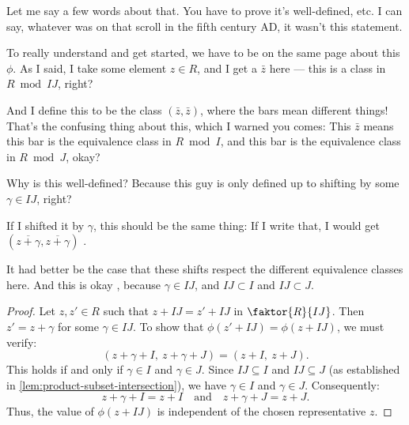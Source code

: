 \begin{speech}[01:21:59 - 01:24:09]
Let me say a few words about that. You have to prove it's well-defined, etc. I can say, whatever was on that scroll in the fifth century AD, it wasn't this statement. 

To really understand and get started, we have to be on the same page about this $\phi$. As I said, I take some element $z \in R$, and I get a $\bar{z}$ here --- this is a class in $R \bmod IJ$, right? 

And I define this to be the class $(\bar{z}, \bar{z})$, where the bars mean different things! That's the confusing thing about this, which I warned you comes: This $\bar{z}$ means this bar is the equivalence class in $R \bmod I$, and this bar is the equivalence class in $R \bmod J$, okay?

Why is this well-defined? Because this guy is only defined up to shifting by some $\gamma \in IJ$, right? 

If I shifted it by $\gamma$, this should be the same thing: If I write that, I would get $(\overline{z + \gamma}, \overline{z + \gamma})$ .

It had better be the case that these shifts respect the different equivalence classes here. And this is okay , because $\gamma \in IJ$, and $IJ \subset I$ and $IJ \subset J$.
\end{speech}

\begin{content}

\begin{proof}
Let $z, z' \in R$ such that $z + IJ = z' + IJ$ in $\faktor{R}{IJ}$.
Then $z' = z + \gamma$ for some $\gamma \in IJ$.
To show that $\phi(z' + IJ) = \phi(z + IJ)$, we must verify:
\[
(z + \gamma + I, \ z + \gamma + J) = (z + I, \ z + J).
\]
This holds if and only if $\gamma \in I$ and $\gamma \in J$.
Since $IJ \subseteq I$ and $IJ \subseteq J$ (as established in \cref{lem:product-subset-intersection}), we have $\gamma \in I$ and $\gamma \in J$.
Consequently:
\[
z + \gamma + I = z + I \quad \text{and} \quad z + \gamma + J = z + J.
\]
Thus, the value of $\phi(z + IJ)$ is independent of the chosen representative $z$.
\end{proof}
\end{content}

